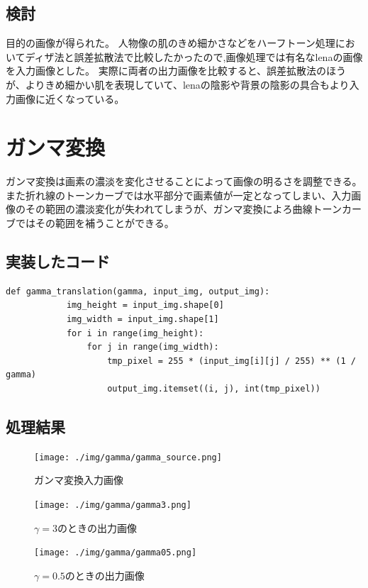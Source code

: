 \documentclass[11pt,a4j]{jsarticle}
\begin{document}
    \subsection{検討}
    目的の画像が得られた。
    人物像の肌のきめ細かさなどをハーフトーン処理においてディザ法と誤差拡散法で比較したかったので,画像処理では有名なlenaの画像を入力画像とした。
    実際に両者の出力画像を比較すると、誤差拡散法のほうが、よりきめ細かい肌を表現していて、lenaの陰影や背景の陰影の具合もより入力画像に近くなっている。

    \section{ガンマ変換}
    ガンマ変換は画素の濃淡を変化させることによって画像の明るさを調整できる。
    また折れ線のトーンカーブでは水平部分で画素値が一定となってしまい、入力画像のその範囲の濃淡変化が失われてしまうが、ガンマ変換によろ曲線トーンカーブではその範囲を補うことができる。
    \subsection{実装したコード}
    \begin{lstlisting}[basicstyle=\ttfamily\footnotesize, frame=single]
        def gamma_translation(gamma, input_img, output_img):
            img_height = input_img.shape[0]
            img_width = input_img.shape[1]
            for i in range(img_height):
                for j in range(img_width):
                    tmp_pixel = 255 * (input_img[i][j] / 255) ** (1 / gamma)
                    output_img.itemset((i, j), int(tmp_pixel))
    \end{lstlisting}
    \subsection{処理結果}
    \begin{figure}[H]
      \centering
      \texttt{[image: ./img/gamma/gamma\_source.png]}
      \caption{ガンマ変換入力画像\label{fig:gamma_source}}
    \end{figure}
    \begin{figure}[H]
      \centering
      \texttt{[image: ./img/gamma/gamma3.png]}
      \caption{$\gamma = 3$のときの出力画像\label{fig:gamma_result}}
    \end{figure}
    \begin{figure}[H]
      \centering
      \texttt{[image: ./img/gamma/gamma05.png]}
      \caption{$\gamma = 0.5$のときの出力画像\label{fig:gammas_result}}
    \end{figure}
\end{document}
